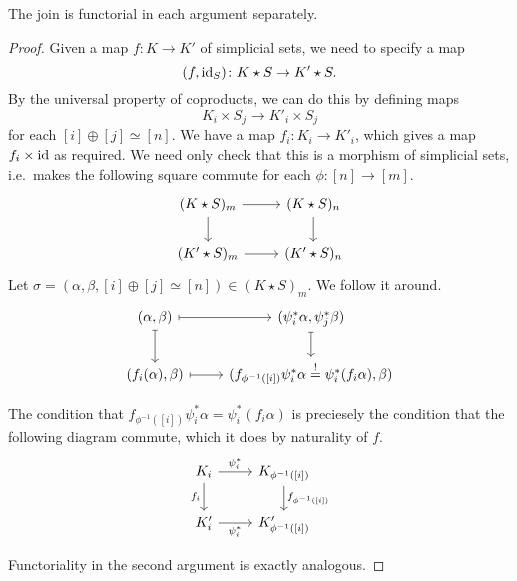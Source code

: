 \documentclass[main.tex]{subfiles}
\begin{document}
\begin{proposition}
  The join is functorial in each argument separately.
\end{proposition}
\begin{proof}
  Given a map $f\colon K \to K'$ of simplicial sets, we need to specify a map
  \begin{equation*}
    (f, \mathrm{id}_{S})\colon K \star S \to K' \star S.
  \end{equation*}
  By the universal property of coproducts, we can do this by defining maps
  \begin{equation*}
    K_{i} \times S_{j} \to K'_{i} \times S_{j}
  \end{equation*}
  for each $[i] \oplus [j] \simeq [n]$. We have a map $f_{i}\colon K_{i} \to K'_{i}$, which gives a map $f_{i} \times \mathrm{id}$ as required. We need only check that this is a morphism of simplicial sets, i.e.\ makes the following square commute for each $\phi\colon [n] \to [m]$.
  \begin{equation*}
    \begin{tikzcd}
      (K \star S)_{m}
      \arrow[r]
      \arrow[d]
      & (K \star S)_{n}
      \arrow[d]
      \\
      (K' \star S)_{m}
      \arrow[r]
      & (K' \star S)_{n}
    \end{tikzcd}
  \end{equation*}
  Let $\sigma = (\alpha, \beta, [i] \oplus [j] \simeq [n]) \in (K \star S)_{m}$. We follow it around.
  \begin{equation*}
    \begin{tikzcd}
      (\alpha, \beta)
      \arrow[r, mapsto]
      \arrow[d, mapsto]
      & (\psi_{i}^{*}\alpha, \psi_{j}^{*}\beta)
      \arrow[d, mapsto]
      \\
      (f_{i}(\alpha), \beta)
      \arrow[r, mapsto]
      & (f_{\phi^{-1}([i])}\psi_{i}^{*}\alpha \overset{!}{=} \psi_{i}^{*}(f_{i}\alpha), \beta)
    \end{tikzcd}
  \end{equation*}

  The condition that $f_{\phi^{-1}([i])}\psi_{i}^{*}\alpha = \psi_{i}^{*}(f_{i}\alpha)$ is preciesely the condition that the following diagram commute, which it does by naturality of $f$.
  \begin{equation*}
    \begin{tikzcd}
      K_{i}
      \arrow[r, "\psi_{i}^{*}"]
      \arrow[d, swap, "f_{i}"]
      & K_{\phi^{-1}([i])}
      \arrow[d, "f_{\phi^{-1}([i])}"]
      \\
      K'_{i}
      \arrow[r, swap, "\psi_{i}^{*}"]
      & K'_{\phi^{-1}([i])}
    \end{tikzcd}
  \end{equation*}

  Functoriality in the second argument is exactly analogous.
\end{proof}
\end{document}
